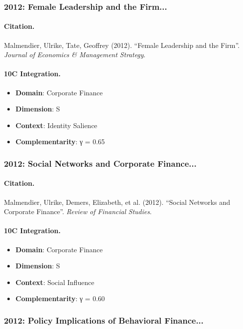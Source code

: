 \subsubsection{2012: Female Leadership and the Firm...}

\paragraph{Citation.}
Malmendier, Ulrike, Tate, Geoffrey (2012). ``Female Leadership and the Firm''. \textit{Journal of Economics & Management Strategy}.

\paragraph{10C Integration.}
\begin{itemize}[nosep]
  \item \textbf{Domain}: Corporate Finance
  \item \textbf{Dimension}: S
  \item \textbf{Context}: Identity Salience
  \item \textbf{Complementarity}: γ = 0.65
\end{itemize}


\subsubsection{2012: Social Networks and Corporate Finance...}

\paragraph{Citation.}
Malmendier, Ulrike, Demers, Elizabeth, et al. (2012). ``Social Networks and Corporate Finance''. \textit{Review of Financial Studies}.

\paragraph{10C Integration.}
\begin{itemize}[nosep]
  \item \textbf{Domain}: Corporate Finance
  \item \textbf{Dimension}: S
  \item \textbf{Context}: Social Influence
  \item \textbf{Complementarity}: γ = 0.60
\end{itemize}


\subsubsection{2012: Policy Implications of Behavioral Finance...}

